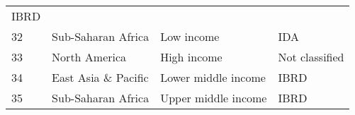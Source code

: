 \documentclass[
]{article}
\begin{document}
\begin{longtable}[]{@{}llll@{}}
\begin{minipage}[t]{0.16\columnwidth}
IBRD\strut
\end{minipage}\tabularnewline
\begin{minipage}[t]{0.06\columnwidth}\raggedright
32\strut
\end{minipage} & \begin{minipage}[t]{0.17\columnwidth}\raggedright
Sub-Saharan Africa\strut
\end{minipage} & \begin{minipage}[t]{0.11\columnwidth}\raggedright
Low income\strut
\end{minipage} & \begin{minipage}[t]{0.16\columnwidth}\raggedright
IDA\strut
\end{minipage}\tabularnewline
\begin{minipage}[t]{0.06\columnwidth}\raggedright
33\strut
\end{minipage} & \begin{minipage}[t]{0.17\columnwidth}\raggedright
North America\strut
\end{minipage} & \begin{minipage}[t]{0.11\columnwidth}\raggedright
High income\strut
\end{minipage} & \begin{minipage}[t]{0.16\columnwidth}\raggedright
Not classified\strut
\end{minipage}\tabularnewline
\begin{minipage}[t]{0.06\columnwidth}\raggedright
34\strut
\end{minipage} & \begin{minipage}[t]{0.17\columnwidth}\raggedright
East Asia \& Pacific\strut
\end{minipage} & \begin{minipage}[t]{0.11\columnwidth}\raggedright
Lower middle income\strut
\end{minipage} & \begin{minipage}[t]{0.16\columnwidth}\raggedright
IBRD\strut
\end{minipage}\tabularnewline
\begin{minipage}[t]{0.06\columnwidth}\raggedright
35\strut
\end{minipage} & \begin{minipage}[t]{0.17\columnwidth}\raggedright
Sub-Saharan Africa\strut
\end{minipage} & \begin{minipage}[t]{0.11\columnwidth}\raggedright
Upper middle income\strut
\end{minipage} & \begin{minipage}[t]{0.16\columnwidth}\raggedright
IBRD\strut
\end{minipage}\tabularnewline
\bottomrule
\end{longtable}
\end{document}
